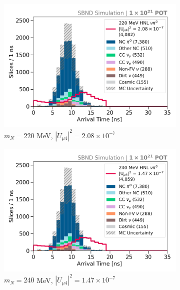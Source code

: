 \begin{figure}[hb!]
        \begin{subfigure}[b]{0.495\textwidth}
            \includegraphics[width=\textwidth]{m220}
            \caption{$m_N = 220$ MeV, $|U_{\mu4}|^2 = 2.08 \times 10^{-7}$ }
        \end{subfigure}
	\hfill
        \begin{subfigure}[b]{0.495\textwidth}
            \includegraphics[width=\textwidth]{m240}
            \caption{$m_N = 240$ MeV, $|U_{\mu4}|^2 = 1.47 \times 10^{-7}$ }
        \end{subfigure}
	\centering
        \begin{subfigure}[b]{0.495\textwidth}

\end{subfigure}
\end{figure}
